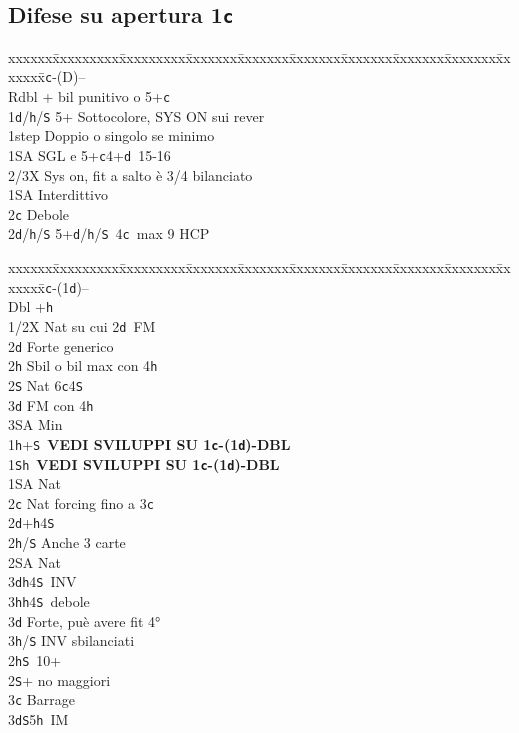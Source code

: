 \documentclass[a4paper,italian]{article}
\newcommand{\BS}{\small{\texttt{S}}}
\newcommand{\BC}{\small{\texttt{c}}}
\newcommand{\BD}{\small{\texttt{d}}}
\newcommand{\BH}{\small{\texttt{h}}}
\newcommand{\pdfc}{\texorpdfstring{\texttt{c}}{C}}
\newenvironment{bidtable}
{\begin{tabbing}

    xxxxxx\=xxxxxxxxx\=xxxxxxxxx\=xxxxxxx\=xxxxxxx\=xxxxxxx\=xxxxxxx\=xxxxxxx\=xxxxxxx\=xxxxxxx\=\kill}
{\end{tabbing} }%
\begin{document}
\begin{multicols}{2}

    \subsection{Difese su apertura 1\pdfc}

    \begin{bidtable}
        1\BC-(D)--\+\\
        Rdbl + bil punitivo o 5+\BC \\
        1\BD/\BH/\BS \> \hspace{5pt} 5+ Sottocolore, SYS ON sui rever\+\\
        1step \> Doppio o singolo se minimo\\
        1\small{SA} \> SGL e 5+\BC 4+\BD\ 15-16\\
        2/3X \> Sys on, fit a salto è 3/4 bilanciato\-\\
        1\small{SA} \> Interdittivo\\
        2\BC \> Debole\\
        2\BD/\BH/\BS \> \hspace{5pt} 5+\BD/\BH/\BS\ 4\BC\ max 9 HCP\-
    \end{bidtable}

    \begin{bidtable}
        1\BC-(1\BD)--\+\\
        Dbl +\BH \+\\
        1/2X \> Nat su cui 2\BD\ FM\\
        2\BD \> Forte generico\\
        2\BH \> Sbil o bil max con 4\BH \\
        2\BS \> Nat 6\BC 4\BS \\
        3\BD \> FM con 4\BH \+\\
        3\small{SA} \> Min\-\-\\
        1\BH {}+\BS\ \textbf{VEDI SVILUPPI SU 1\BC -(1\BD )-DBL}\\
        1\BS {}\BH\ \textbf{VEDI SVILUPPI SU 1\BC -(1\BD )-DBL}\\
        1\small{SA} \> Nat\\
        2\BC \> Nat forcing fino a 3\BC \\
        2\BD {}+\BH 4\BS \+\\
        2\BH/\BS \> Anche 3 carte\\
        2\small{SA} \> Nat\+\\
        3\BD {}\BH 4\BS\ INV\\
        3\BH {}\BH 4\BS\ debole\-\\
        3\BD \> Forte, puè avere fit 4°\\
        3\BH/\BS \> INV sbilanciati\-\\
        2\BH {}\BS\ 10+\\
        2\BS {}+ no maggiori\\
        3\BC \> Barrage\\
        3\BD {}\BS 5\BH\ IM\-
    \end{bidtable}


\end{multicols}
\end{document}
